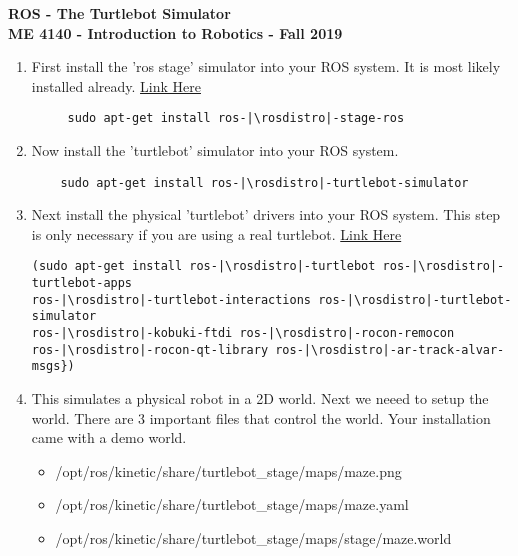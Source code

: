 \documentclass[12pt]{article}
\newcommand{\rosdistro}{kinetic}
\newcommand{\pthname}{/opt/ros/\rosdistro/share/turtlebot\_stage/maps/}
\begin{document}
\thispagestyle{plain}

\begin{center}
   {\bf \Large ROS - The Turtlebot Simulator}\vspace{2mm} \\
   {\bf \large ME 4140 - Introduction to Robotics - Fall 2019} \\
\end{center}


\begin{enumerate}
	
	\item First install the 'ros stage' simulator into your ROS system. It is most likely installed already. \href{http://wiki.ros.org/turtlebot_simulator} {Link Here} \\
    
	\begin{verbatim}
	 sudo apt-get install ros-|\rosdistro|-stage-ros 
	 \end{verbatim}
	
    \item Now install the 'turtlebot' simulator into your ROS system.
    
	\begin{verbatim} 
	sudo apt-get install ros-|\rosdistro|-turtlebot-simulator
	\end{verbatim}

    \item Next install the physical 'turtlebot' drivers into your ROS system. This step is only necessary if you are using a real turtlebot. \href{http://wiki.ros.org/Robots/TurtleBot} {Link Here} 
   \begin{verbatim}  
(sudo apt-get install ros-|\rosdistro|-turtlebot ros-|\rosdistro|-turtlebot-apps
ros-|\rosdistro|-turtlebot-interactions ros-|\rosdistro|-turtlebot-simulator 
ros-|\rosdistro|-kobuki-ftdi ros-|\rosdistro|-rocon-remocon 
ros-|\rosdistro|-rocon-qt-library ros-|\rosdistro|-ar-track-alvar-msgs})
\end{verbatim}
    
    \item This simulates a physical robot in a 2D world. Next we neeed to setup the world. There are 3 important files that control the world. Your installation came with a demo world.
    \begin{itemize}
    
        \item {\selectfont  \hspace{5mm} \pthname maze.png}
        \item {\selectfont  \hspace{5mm} \pthname maze.yaml}
        \item {\selectfont  \hspace{5mm} \pthname stage/maze.world}
    

\end{itemize}
\end{enumerate}
\end{document}
